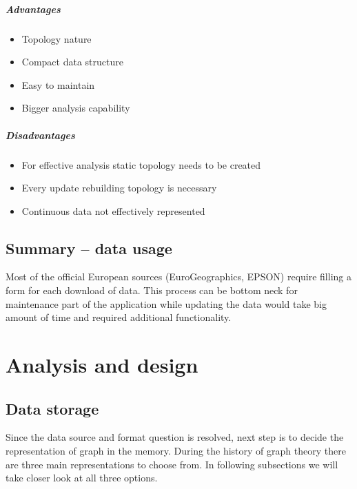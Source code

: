 \documentclass[thesis=M,english]{FITthesis}[2012/10/20]
\begin{document}
\paragraph*{Advantages}
\begin{itemize}[noitemsep]
\item Topology nature
\item Compact data structure
\item Easy to maintain
\item Bigger analysis capability
\end{itemize}

\paragraph*{Disadvantages}
\begin{itemize}[noitemsep]
\item For effective analysis static topology needs to be created
\item Every update rebuilding topology is necessary
\item Continuous data not effectively represented
\end{itemize}

\section{Summary -- data usage}
Most of the official European sources (EuroGeographics, EPSON) require filling a form for each download of data. This process can be bottom neck for maintenance part of the application while updating the data would take big amount of time and required additional functionality. 


\chapter{Analysis and design}

\section{Data storage}
Since the data source and format question is resolved, next step is to decide the representation of graph in the memory. During the history of graph theory there are three main representations to choose from. In following subsections we will take closer look at all three options.
\end{document}
